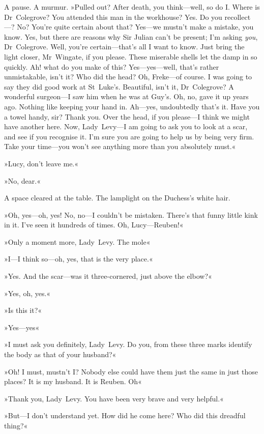 A pause. A murmur. »Pulled out? After death, you think—well, so do I\@. Where is Dr~Colegrove? You attended this man in the workhouse? Yes. Do you recollect---? No? You're quite certain about that? Yes—we mustn't make a mistake, you know. Yes, but there are reasons why Sir Julian can't be present; I'm asking \textit{you}, Dr~Colegrove. Well, you're certain—that's all I want to know. Just bring the light closer, Mr~Wingate, if you please. These miserable shells let the damp in so quickly. Ah! what do you make of this? Yes—yes—well, that's rather unmistakable, isn't it? Who did the head? Oh, Freke—of course. I was going to say they did good work at St~Luke's. Beautiful, isn't it, Dr~Colegrove? A wonderful surgeon—I saw him when he was at Guy's. Oh, no, gave it up years ago. Nothing like keeping your hand in. Ah—yes, undoubtedly that's it. Have you a towel handy, sir? Thank you. Over the head, if you please—I think we might have another here. Now, Lady~Levy—I am going to ask you to look at a scar, and see if you recognise it. I'm sure you are going to help us by being very firm. Take your time—you won't see anything more than you absolutely must.«

»Lucy, don't leave me.«

»No, dear.«

A space cleared at the table. The lamplight on the Duchess's white hair.

»Oh, yes—oh, yes! No, no—I couldn't be mistaken. There's that funny little kink in it. I've seen it hundreds of times. Oh, Lucy—Reuben!«

»Only a moment more, Lady~Levy. The mole\longdash«

»I—I think so—oh, yes, that is the very place.«

»Yes. And the scar—was it three-cornered, just above the elbow?«

»Yes, oh, yes.«

»Is this it?«

»Yes—yes\longdash«

»I must ask you definitely, Lady~Levy. Do you, from these three marks identify the body as that of your husband?«

»Oh! I must, mustn't I\@? Nobody else could have them just the same in just those places? It is my husband. It is Reuben. Oh\longdash«

»Thank you, Lady~Levy. You have been very brave and very helpful.«

»But—I don't understand yet. How did he come here? Who did this dreadful thing?«

